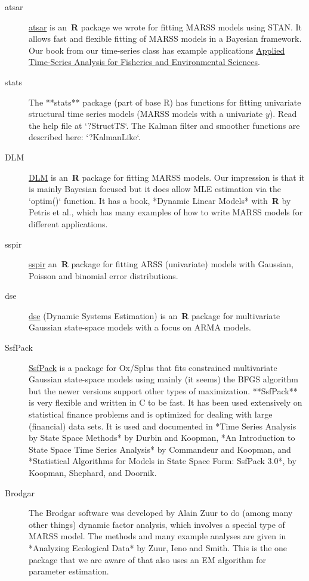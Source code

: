 \documentclass[12pt,]{book}
\begin{document}
\begin{description}
    \item[atsar] \href{https://nwfsc-timeseries.github.io/atsar/}{atsar} is an \,\textbf{R} package we wrote for fitting MARSS models using STAN.  It allows fast and flexible fitting of MARSS models in a Bayesian framework.  Our book from our time-series class has example applications \href{https://nwfsc-timeseries.github.io/atsa-labs/}{Applied Time-Series Analysis for Fisheries and Environmental Sciences}.
  \item[stats] The **stats** package (part of base R) has functions for fitting univariate structural time series models (MARSS models with a univariate $y$).  Read the help file at `?StructTS`. The Kalman filter and smoother functions are described here: `?KalmanLike`.
    \item[DLM] \href{https://cran.r-project.org/package=dlm}{DLM} is an \,\textbf{R} package for fitting MARSS models.  Our impression is that it is mainly Bayesian focused but it does allow MLE estimation via the `optim()` function.  It has a book, *Dynamic Linear Models* with \,\textbf{R}  by Petris et al., which has many examples of how to write MARSS models for different applications.
    \item[sspir] \href{https://cran.r-project.org/package=sspir}{sspir} an \,\textbf{R} package for fitting ARSS (univariate) models with Gaussian, Poisson and binomial error distributions.  
    \item[dse] \href{https://cran.r-project.org/package=dse}{dse} (Dynamic Systems Estimation) is an \,\textbf{R} package for multivariate Gaussian state-space models with a focus on ARMA models.
    \item[SsfPack] \href{http://www.ssfpack.com/}{SsfPack} is a package for Ox/Splus that fits constrained multivariate Gaussian state-space models using mainly (it seems) the BFGS algorithm but the newer versions support other types of maximization.  **SsfPack** is very flexible and written in C to be fast.  It has been used extensively on statistical finance problems and is optimized for dealing with large (financial) data sets.  It is used and documented in *Time Series Analysis by State Space Methods* by Durbin and Koopman, *An Introduction to State Space Time Series Analysis* by Commandeur and Koopman, and *Statistical Algorithms for Models in State Space Form: SsfPack 3.0*, by Koopman, Shephard, and Doornik.
    \item[Brodgar] The Brodgar software was developed by Alain Zuur to do (among many other things) dynamic factor analysis, which involves a special type of MARSS model.  The methods and many example analyses are given in *Analyzing Ecological Data* by Zuur, Ieno and Smith.  This is the one package that we are aware of that also uses an EM algorithm for parameter estimation.

\end{description}
\end{document}
